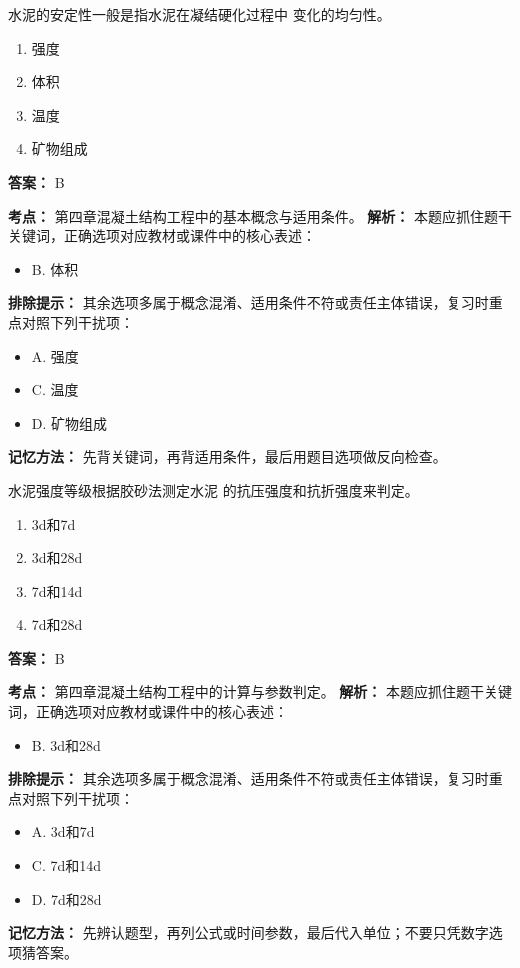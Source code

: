 \documentclass[UTF8,fontset=fandol,11pt]{ctexart}
\begin{document}
\begin{quizbox}[title={第 44 题}]
水泥的安定性一般是指水泥在凝结硬化过程中 变化的均匀性。\\
\begin{enumerate}[label=\Alph*.]
\item 强度
\item 体积
\item 温度
\item 矿物组成
\end{enumerate}
\textbf{答案：} B
\vspace{0.25em}
\begin{answerbox}[title={考点解析}]
\textbf{考点：} 第四章混凝土结构工程中的基本概念与适用条件。
\textbf{解析：} 本题应抓住题干关键词，正确选项对应教材或课件中的核心表述：
\begin{itemize}
\item B. 体积
\end{itemize}
\textbf{排除提示：} 其余选项多属于概念混淆、适用条件不符或责任主体错误，复习时重点对照下列干扰项：
\begin{itemize}
\item A. 强度
\item C. 温度
\item D. 矿物组成
\end{itemize}
\textbf{记忆方法：} 先背关键词，再背适用条件，最后用题目选项做反向检查。
\end{answerbox}
\end{quizbox}

\begin{quizbox}[title={第 45 题}]
水泥强度等级根据胶砂法测定水泥 的抗压强度和抗折强度来判定。\\
\begin{enumerate}[label=\Alph*.]
\item 3d和7d
\item 3d和28d
\item 7d和14d
\item 7d和28d
\end{enumerate}
\textbf{答案：} B
\vspace{0.25em}
\begin{answerbox}[title={考点解析}]
\textbf{考点：} 第四章混凝土结构工程中的计算与参数判定。
\textbf{解析：} 本题应抓住题干关键词，正确选项对应教材或课件中的核心表述：
\begin{itemize}
\item B. 3d和28d
\end{itemize}
\textbf{排除提示：} 其余选项多属于概念混淆、适用条件不符或责任主体错误，复习时重点对照下列干扰项：
\begin{itemize}
\item A. 3d和7d
\item C. 7d和14d
\item D. 7d和28d
\end{itemize}
\textbf{记忆方法：} 先辨认题型，再列公式或时间参数，最后代入单位；不要只凭数字选项猜答案。
\end{answerbox}
\end{quizbox}
\end{document}
